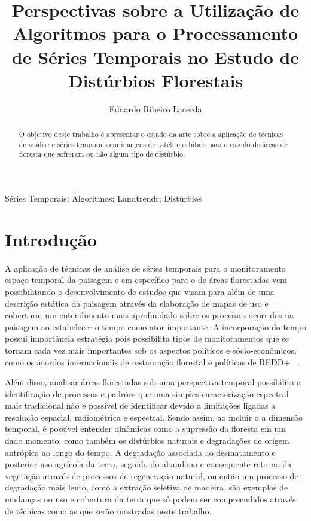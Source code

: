 \documentclass{article}
\title{Perspectivas sobre a Utilização de Algoritmos para o Processamento de Séries Temporais no Estudo de Distúrbios Florestais}
\author{Eduardo Ribeiro Lacerda }
\date{\the\year}
\providecommand{\keywords}[1]
{
  \small	
  \textbf{\text{Palavras-chave---}} #1
}
\begin{document}
\maketitle

\begin{abstract}
O objetivo deste trabalho é apresentar o estado da arte sobre a aplicação de técnicas de análise e séries temporais em imagens de satélite orbitais para o estudo de áreas de floresta que sofreram ou não algum tipo de distúrbio.    
\end{abstract}

\vspace{1cm}
\keywords{Séries Temporais; Algoritmos; Landtrendr; Distúrbios}

\section{Introdução}
A aplicação de técnicas de análise de séries temporais para o monitoramento espaço-temporal da paisagem e em específico para o de áreas florestadas vem possibilitando o desenvolvimento de estudos que visam para além de uma descrição estática da paisagem através da elaboração de mapas de uso e cobertura, um entendimento mais aprofundado sobre os processos ocorridos na paisagem ao estabelecer o tempo como ator importante. A incorporação do tempo possui importância estratégia pois possibilita tipos de monitoramentos que se tornam cada vez mais importantes sob os aspectos políticos e sócio-econômicos, como os acordos internacionais de restauração florestal e políticas de REDD+ ~\cite{BOS2019295, CROUZEILLES2019}. 
\par
Além disso, analisar áreas florestadas sob uma perspectiva temporal possibilita a identificação de processos e padrões que uma simples caracterização espectral mais tradicional não é possível de identificar devido a limitações ligadas a resolução espacial, radiométrica e espectral. Sendo assim, ao incluir o a dimensão temporal, é possível entender dinâmicas como a supressão da floresta em um dado momento, como também os distúrbios naturais e degradações de origem antrópica ao longo do tempo.
A degradação associada ao desmatamento e posterior uso agrícola da terra, seguido do abandono e consequente retorno da vegetação através de processos de regeneração natural, ou então um processo de degradação mais lento, como a extração seletiva de madeira, são exemplos de mudanças no uso e cobertura da terra que só podem ser compreendidos através de técnicas como as que serão mostradas neste trabalho. \par
\end{document}
